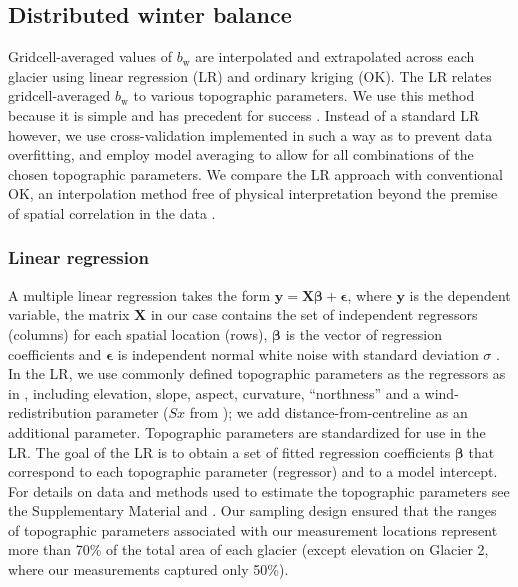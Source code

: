 \documentclass[review,oneside, letterpaper]{igs}
\renewcommand{\vector}[1]{\mathbf{#1}}
\begin{document}
\subsection{Distributed winter balance}

Gridcell-averaged values of $b_\mathrm{w}$ are interpolated and extrapolated across each glacier using linear regression (LR) and ordinary kriging (OK). The LR relates gridcell-averaged $b_\mathrm{w}$ to various topographic parameters. We use this method because it is simple and has precedent for success \citep[e.g.][]{McGrath2015}. Instead of a standard LR however, we use cross-validation implemented in such a way as to prevent data overfitting, and employ model averaging to allow for all combinations of the chosen topographic parameters. We compare the LR approach with conventional OK, an interpolation method free of physical interpretation beyond the premise of spatial correlation in the data \citep[e.g.][]{Hock1999,Rasmussen2006}.

\subsubsection{Linear regression}

A multiple linear regression takes the form $\vector{y} = \vector{X} \vector{\beta} + \vector{\epsilon}$, where $\vector{y}$ is the dependent variable, the matrix $\vector{X}$ in our case contains the set of independent regressors (columns) for each spatial location (rows), $\vector{\beta}$ is the vector of regression coefficients and $\vector{\epsilon}$ is independent normal white noise with standard deviation $\sigma$ \citep[e.g.][]{Davis1986}. 
In the LR, we use commonly defined topographic parameters as the regressors as in \cite{McGrath2015}, including elevation, slope, aspect, curvature, ``northness'' and a wind-redistribution parameter ($Sx$ from \cite{Winstral2002}); we add distance-from-centreline as an additional parameter. Topographic parameters are standardized for use in the LR. 
The goal of the LR is to obtain a set of fitted regression coefficients $\vector{\beta}$ that correspond to each topographic parameter (regressor) and to a model intercept. 
For details on data and methods used to estimate the topographic parameters see the Supplementary Material and \cite{Pulwicki2017}. Our sampling design ensured that the ranges of topographic parameters associated with our measurement locations represent more than 70\% of the total area of each glacier (except elevation on Glacier 2, where our measurements captured only 50\%). 
\end{document}
